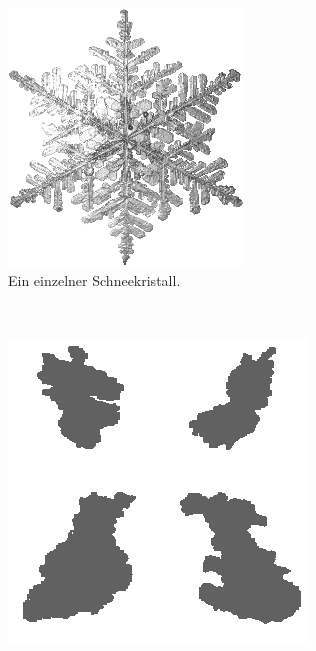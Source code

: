 \begin{figure}
    \begin{subfigure}[b]{0.5\textwidth}
            \centering
            \includegraphics[width=\textwidth]{images/single_snow_crystal}
            \caption{Ein einzelner  Schneekristall\cite{Yanagi2011}.}
            \label{fig:implementation_single_snow_crystal}
    \end{subfigure}
    ~
    \begin{subfigure}[b]{0.5\textwidth}
            \centering
            \includegraphics[width=\textwidth]{images/real_snowflakes}

\end{subfigure}
\end{figure}
